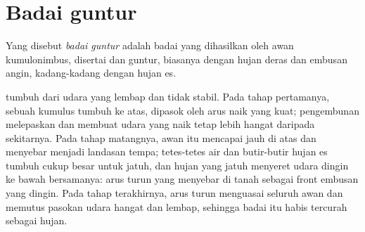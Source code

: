 \section{Badai guntur}

\begin{definition}\label{def:g10:storms-and-cyclones:thunderstorm}
Yang disebut \emph{badai guntur} adalah badai yang
dihasilkan oleh awan kumulonimbus, disertai  dan guntur, biasanya dengan
hujan deras dan embusan angin, kadang-kadang dengan hujan es.
\end{definition}

 tumbuh dari udara yang lembap dan tidak stabil. Pada tahap
pertamanya, sebuah kumulus tumbuh ke atas, dipasok oleh arus naik yang kuat;
pengembunan melepaskan  dan membuat udara yang naik tetap lebih
hangat daripada sekitarnya. Pada tahap matangnya, awan itu mencapai  jauh di atas dan menyebar menjadi landasan tempa; tetes-tetes air dan
butir-butir hujan es tumbuh cukup besar untuk jatuh, dan hujan yang jatuh
menyeret udara dingin ke bawah bersamanya: arus turun yang menyebar di tanah
sebagai front embusan yang dingin. Pada tahap terakhirnya, arus turun
menguasai seluruh awan dan memutus pasokan udara hangat dan lembap, sehingga
badai itu habis tercurah sebagai hujan.

